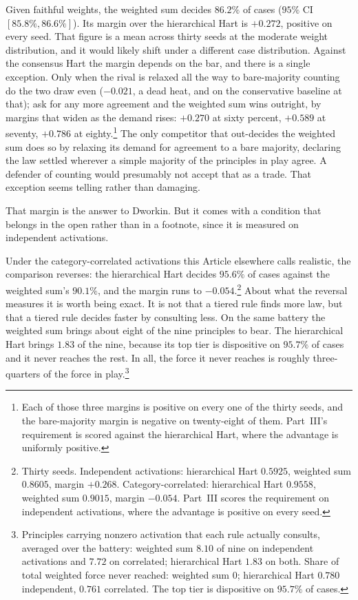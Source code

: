 Given faithful weights, the weighted sum decides $86.2\%$ of cases ($95\%$
CI $[85.8\%, 86.6\%]$). Its margin over the hierarchical Hart is $+0.272$, positive on every seed.
That figure is a mean across thirty seeds at the moderate weight distribution,
and it would likely shift under a different case distribution. Against the
consensus Hart the margin depends on the bar, and there is a single exception.
Only when the rival is relaxed all the way to bare-majority counting do the
two draw even ($-0.021$, a dead heat, and on the conservative baseline at
that); ask for any more agreement and the weighted sum wins outright, by
margins that widen as the demand rises: $+0.270$ at sixty percent, $+0.589$
at seventy, $+0.786$ at eighty.\footnote{Each of those three margins is
positive on every one of the thirty seeds, and the bare-majority margin is
negative on twenty-eight of them. Part~III's requirement is scored against the
hierarchical Hart, where the advantage is uniformly positive.} The only competitor that out-decides the weighted sum does so by relaxing its
demand for agreement to a bare majority, declaring the law settled wherever a
simple majority of the principles in play agree. A defender of counting would
presumably not accept that as a trade. That exception seems telling rather than damaging.

That margin is the answer to Dworkin. But it comes with a condition that
belongs in the open rather than in a footnote, since it is measured on
independent activations.

Under the category-correlated activations this
Article elsewhere calls realistic, the comparison reverses: the
hierarchical Hart decides $95.6\%$ of cases against the weighted sum's
$90.1\%$, and the margin runs to $-0.054$.\footnote{Thirty seeds.
Independent activations: hierarchical Hart $0.5925$, weighted sum $0.8605$,
margin $+0.268$. Category-correlated: hierarchical Hart $0.9558$, weighted
sum $0.9015$, margin $-0.054$. Part~III scores the requirement on
independent activations, where the advantage is positive on every seed.}
About what the reversal measures it is worth being exact. It is not that a
tiered rule finds more law, but that a tiered rule decides faster by
consulting less. On the same battery the weighted sum brings about eight
of the nine principles to bear. The hierarchical Hart brings $1.83$ of the nine,
because its top tier is dispositive on $95.7\%$ of cases and it never
reaches the rest. In all, the force it never reaches is roughly three-quarters of the force
in play.\footnote{Principles carrying nonzero activation that
each rule actually consults, averaged over the battery: weighted sum $8.10$
of nine on independent activations and $7.72$ on correlated; hierarchical
Hart $1.83$ on both. Share of total weighted force never reached: weighted
sum $0$; hierarchical Hart $0.780$ independent, $0.761$ correlated. The top
tier is dispositive on $95.7\%$ of cases.}

